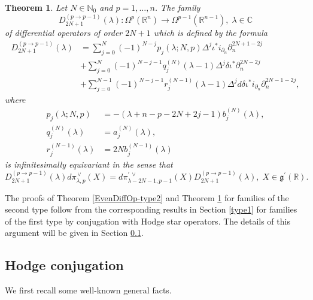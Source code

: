 \documentclass[a4paper,12pt,reqno]{amsart}
\newtheorem{theorem}{Theorem}
\numberwithin{theorem}{subsection}
\numberwithin{equation}{section}
\begin{document}
\begin{theorem}\label{OddDiffOp-type2} Let $N\in{\mathbb{N}}_0$ and $p=1,\dots,n$. The family
\begin{equation*}
   D_{2N+1}^{(p\to p-1)}(\lambda): \Omega^p({\mathbb{R}}^n) \to \Omega^{p-1}({\mathbb{R}}^{n-1}), \;
   \lambda \in {\mathbb{C}}
\end{equation*}
of differential operators of order $2N+1$ which is defined by the formula
\begin{align}
   D^{(p\to p-1)}_{2N+1}(\lambda) & = \sum_{j=0}^N(-1)^{N-j}
   p_j(\lambda;N,p) \Delta^j \iota^* i_{\partial_n} \partial_n^{2N+1-2j} \nonumber\\
   & + \sum_{j=0}^{N}(-1)^{N-j-1} q_j^{(N)}(\lambda\!-\!1) \Delta^j \delta \iota^* \partial_n^{2N-2j} \nonumber\\
   & + \sum_{j=0}^{N-1}(-1)^{N-j-1} r_j^{(N-1)}(\lambda\!-\!1) \Delta^{j} {d} \delta \iota^* i_{\partial_n}
   \partial_n^{2N-1-2j},
\end{align}
where
\begin{align*}
   p_j(\lambda;N,p) & = -(\lambda\!+\!n\!-\!p\!-\!2N\!+\!2j\!-\!1) b_j^{(N)}(\lambda), \\
   q_j^{(N)}(\lambda) & = a_j^{(N)}(\lambda), \\
   r_j^{(N-1)}(\lambda) & = 2N b_j^{(N-1)}(\lambda)
\end{align*}
is infinitesimally equivariant in the sense that
\begin{equation}\label{equiv-odd}
   D^{(p \to p-1)}_{2N+1}(\lambda) {d} \pi_{\lambda,p}^{{\,\vee}}(X)
   = {d} \pi^{\prime {{\,\vee}}}_{\lambda-2N-1,p-1} (X) D^{(p \to
   p-1)}_{2N+1}(\lambda), \; X \in {{\mathfrak g}}^{\prime}({\mathbb{R}}).
\end{equation}
\end{theorem}

The proofs of Theorem \ref{EvenDiffOp-type2} and Theorem \ref{OddDiffOp-type2}
for families of the second type follow from the corresponding results in
Section \ref{type1} for families of the first type by conjugation with Hodge
star operators. The details of this argument will be given in Section
\ref{Hodge}.

\subsection{Hodge conjugation}\label{Hodge}

We first recall some well-known general facts.
\end{document}
